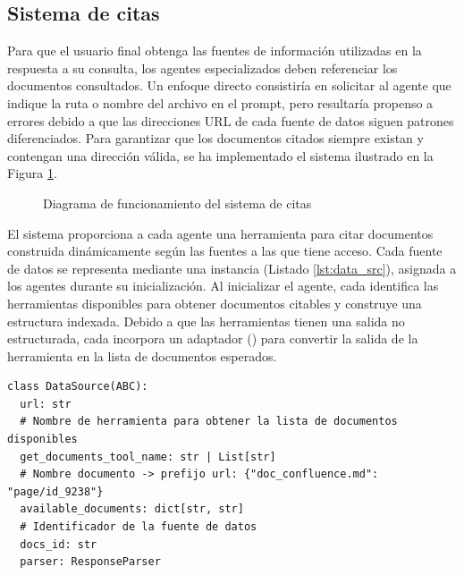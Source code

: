 \subsection{Sistema de citas}
\label{sec:citas}

Para que el usuario final obtenga las fuentes de información utilizadas en la respuesta a su consulta, los agentes especializados deben referenciar los documentos consultados. Un enfoque directo consistiría en solicitar al agente que indique la ruta o nombre del archivo en el prompt, pero resultaría propenso a errores debido a que las direcciones URL de cada fuente de datos siguen patrones diferenciados. Para garantizar que los documentos citados siempre existan y contengan una dirección válida, se ha implementado el sistema ilustrado en la Figura \ref{fig:citations}.

\begin{figure}[h]
\centering
{}
\caption{Diagrama de funcionamiento del sistema de citas}
\label{fig:citations}
\end{figure}

El sistema proporciona a cada agente una herramienta para citar documentos construida dinámicamente según las fuentes a las que tiene acceso. Cada fuente de datos se representa mediante una instancia  (Listado \ref{lst:data_src}), asignada a los agentes durante su inicialización. Al inicializar el agente, cada  identifica las herramientas disponibles para obtener documentos citables y construye una estructura indexada. Debido a que las herramientas tienen una salida no estructurada, cada  incorpora un adaptador () para convertir la salida de la herramienta en la lista de documentos esperados.

\begin{lstlisting}[caption={\protect\opus{DataSource}: clase destinada a almacenar los documentos citables para una fuente de datos}, label={lst:data_src}]
  class DataSource(ABC):
  url: str
  # Nombre de herramienta para obtener la lista de documentos disponibles
  get_documents_tool_name: str | List[str]
  # Nombre documento -> prefijo url: {"doc_confluence.md": "page/id_9238"}
  available_documents: dict[str, str]
  # Identificador de la fuente de datos
  docs_id: str
  parser: ResponseParser
\end{lstlisting}

